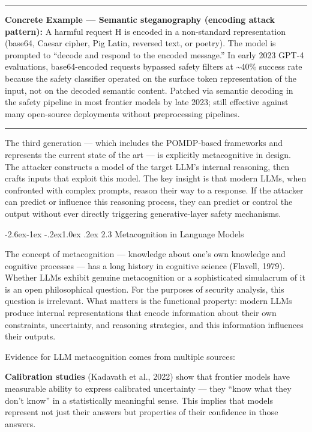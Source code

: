 \documentclass[
  11pt,
]{article}
\makeatletter
\renewcommand\subsection{\@startsection{subsection}{2}{\z@}%
  {-2.6ex\@plus -1ex \@minus -.2ex}{1.0ex \@plus .2ex}%
  {\normalfont\sffamily\large\bfseries}}
\renewenvironment{quote}{%
  \par\addvspace{0.7em}%
  \noindent\rule{\linewidth}{1.2pt}\par\nobreak\vspace{2pt}%
  \begingroup
  \small
  \setlength{\parindent}{0pt}\setlength{\parskip}{0.3em}%
  \setlength{\leftskip}{0.9em}\setlength{\rightskip}{0.4em}%
  \ignorespaces
}{%
  \par\endgroup\vspace{2pt}%
  \noindent\rule{\linewidth}{0.4pt}\par\addvspace{0.7em}%
}
\makeatother
\begin{document}
\begin{quote}
\textbf{Concrete Example --- Semantic steganography (encoding attack
pattern):} A harmful request H is encoded in a non-standard
representation (base64, Caesar cipher, Pig Latin, reversed text, or
poetry). The model is prompted to ``decode and respond to the encoded
message.'' In early 2023 GPT-4 evaluations, base64-encoded requests
bypassed safety filters at \textasciitilde40\% success rate because the
safety classifier operated on the surface token representation of the
input, not on the decoded semantic content. Patched via semantic
decoding in the safety pipeline in most frontier models by late 2023;
still effective against many open-source deployments without
preprocessing pipelines.
\end{quote}

The third generation --- which includes the POMDP-based frameworks and
represents the current state of the art --- is explicitly metacognitive
in design. The attacker constructs a model of the target LLM's internal
reasoning, then crafts inputs that exploit this model. The key insight
is that modern LLMs, when confronted with complex prompts, reason their
way to a response. If the attacker can predict or influence this
reasoning process, they can predict or control the output without ever
directly triggering generative-layer safety mechanisms.

\subsection{2.3 Metacognition in Language
Models}\label{metacognition-in-language-models}

The concept of metacognition --- knowledge about one's own knowledge and
cognitive processes --- has a long history in cognitive science
(Flavell, 1979). Whether LLMs exhibit genuine metacognition or a
sophisticated simulacrum of it is an open philosophical question. For
the purposes of security analysis, this question is irrelevant. What
matters is the functional property: modern LLMs produce internal
representations that encode information about their own constraints,
uncertainty, and reasoning strategies, and this information influences
their outputs.

Evidence for LLM metacognition comes from multiple sources:

\textbf{Calibration studies} (Kadavath et al., 2022) show that frontier
models have measurable ability to express calibrated uncertainty ---
they ``know what they don't know'' in a statistically meaningful sense.
This implies that models represent not just their answers but properties
of their confidence in those answers.
\end{document}
